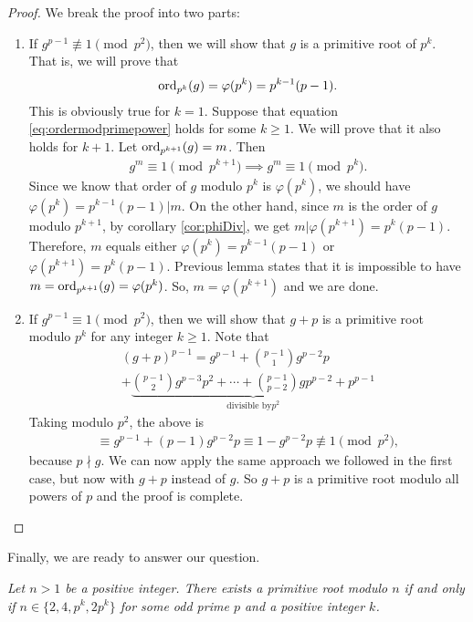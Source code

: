 \documentclass{subfile}
\begin{document}
	\begin{proof}
		We break the proof into two parts:
		\begin{enumerate}
			\item If $g^{p-1} \not \equiv 1 \pmod{p^2}$, then we will show that $g$ is a primitive root of $p^k$. That is, we will prove that
				\begin{align}\label{eq:ordermodprimepower}
					\operatorname{ord}_{p^k} (g)=\varphi(p^k)=p^{k-1}(p-1).
				\end{align}
			This is obviously true for $k=1$. Suppose that equation \eqref{eq:ordermodprimepower} holds for some $k\geq 1$. We will prove that it also holds for $k+1$. Let $\operatorname{ord}_{p^{k+1}} (g)=m$. Then
				\begin{align*}
					g^m \equiv 1 \pmod{p^{k+1}} \implies g^m \equiv 1 \pmod{p^{k}}.
				\end{align*}
			Since we know that order of $g$ modulo $p^k$ is $\varphi(p^k)$, we should have $\varphi(p^k)=p^{k-1}(p-1)|m$. On the other hand, since $m$ is the order of $g$ modulo $p^{k+1}$, by corollary \eqref{cor:phiDiv}, we get $m|\varphi(p^{k+1})=p^k(p-1)$. Therefore, $m$ equals either $\varphi(p^k)=p^{k-1}(p-1)$ or $\varphi(p^{k+1})=p^{k}(p-1)$. Previous lemma states that it is impossible to have $m=\operatorname{ord}_{p^{k+1}} (g)=\varphi(p^k)$. So, $m=\varphi(p^{k+1})$ and we are done.

			\item If $g^{p-1} \equiv 1 \pmod{p^2}$, then we will show that $g+p$ is a primitive root modulo $p^k$ for any integer $k\geq 1$. Note that
				\begin{multline*}
					(g+p)^{p-1} = g^{p-1} + \binom{p-1}{1} g^{p-2}p \\ + \underbrace{\binom{p-1}{2}g^{p-3}p^2+\cdots + \binom{p-1}{p-2} gp^{p-2} + p^{p-1}}_{\mbox{divisible by} p^2}
				\end{multline*}
			Taking modulo $p^2$, the above is
				\begin{align*}
					\equiv g^{p-1}+(p-1)g^{p-2}p \equiv 1 - g^{p-2}p \not \equiv 1 \pmod{p^2},
				\end{align*}
			because $p \nmid g$. We can now apply the same approach we followed in the first case, but now with $g+p$ instead of $g$. So $g+p$ is a primitive root modulo all powers of $p$ and the proof is complete.
		\end{enumerate}
	\end{proof}

Finally, we are ready to answer our question.

	\begin{theorem}\slshape
		Let $n>1$ be a positive integer. There exists a primitive root modulo $n$ if and only if $n\in\{2,4,p^k,2p^k\}$ for some odd prime $p$ and a positive integer $k$.
		\label{thm:pr:wh}
	\end{theorem}
\end{document}

